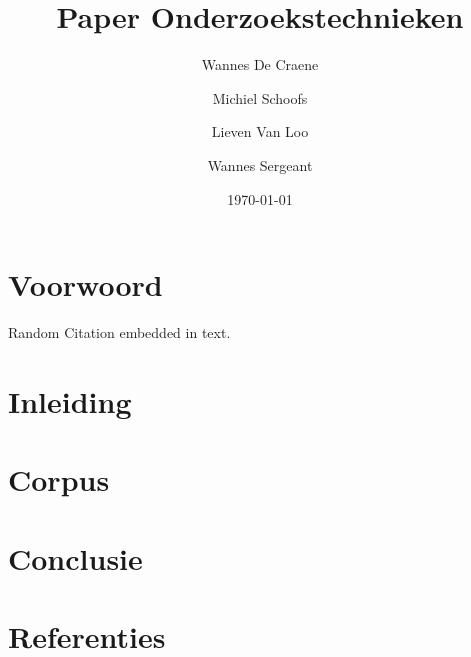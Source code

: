 \documentclass[12pt,a4paper]{article}
\author{Wannes {De Craene} \and Michiel Schoofs \and Lieven {Van Loo} \and Wannes Sergeant}
\title{Paper Onderzoekstechnieken}
\date{\today}
\begin{document}
    
    \maketitle
    \tableofcontents
    \newpage
    \section{Voorwoord}
    
    Random Citation \cite{Auteur2019} embedded in text.
    \newpage
    \section{Inleiding}
    
    \newpage
    \section{Corpus}
    
    \newpage
    \section{Conclusie}
    
    \newpage
    \section{Referenties}

    \printbibliography
    
\end{document}
